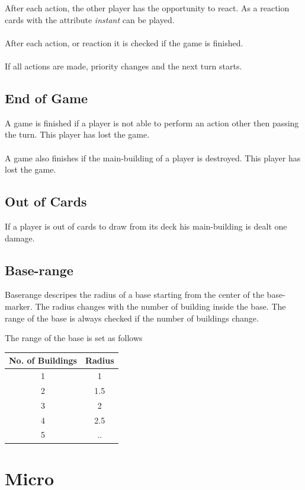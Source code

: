 \documentclass[a5paper,pagesize,10pt,bibtotoc,pointlessnumbers,
normalheadings,DIV=9,twoside=false]{scrbook}
\begin{document}
After each action, the other player has the opportunity to react. As a reaction cards with the attribute \emph{instant} can be played.\\
\\
After each action, or reaction it is checked if the game is finished.\\
\\
If all actions are made, priority changes and the next turn starts.

\section{End of Game}
A game is finished if a player is not able to perform an action other then passing the turn. This player has lost the game.\\
\\
A game also finishes if the main-building of a player is destroyed. This player has lost the game.

\section{Out of Cards}
If a player is out of cards to draw from its deck his main-building is dealt one damage.

\section{Base-range}
Baserange descripes the radius of a base starting from the center of the base-marker. The radius changes with the number of building inside the base.
The range of the base is always checked if the number of buildings change.

The range of the base is set as follows

\begin{center}
 \begin{tabular}{||c c||} 
 \hline
 No. of Buildings & Radius\\
 \hline\hline
 1 & 1 \\ 
 \hline
 2 & 1.5 \\
 \hline
 3 & 2 \\
 \hline
 4 & 2.5\\
 \hline
 5 & .. \\
 \hline
\end{tabular}
\end{center}


\chapter{Micro}
\end{document}
